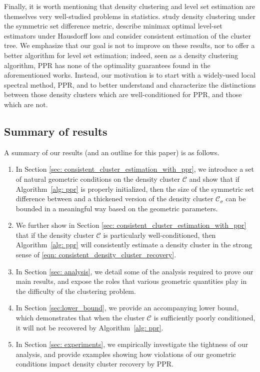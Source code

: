 \documentclass[11pt,twoside]{article}
\newcommand{\1}{\mathbbm{1}}
\newcommand{\Cset}{\mathcal{C}}
\newcommand{\Csig}{\Cset_{\sigma}}
\newcommand{\Cest}{\widehat{C}}
\begin{document}
Finally, it is worth mentioning that density clustering and level set estimation
are themselves very well-studied problems in statistics. \citet{polonik1995,
  rigollet2009} study density clustering under the symmetric set difference
metric, \citet{tsybakov1997,singh2009} describe minimax optimal level-set
estimators under Hausdorff loss and
\citet{hartigan1981,chaudhuri2010,balakrishnan2013,kpotufe11} consider
consistent estimation of the cluster tree. We emphasize that our goal is
not to improve on these results, nor to offer a better algorithm for level set
estimation; indeed, seen as a density clustering algorithm, PPR has none 
of the optimality guarantees found in the aforementioned works. Instead, our
motivation is to start with a widely-used local spectral method, PPR, and to
better understand and characterize the distinctions between those density 
clusters which are well-conditioned for PPR, and those which are not.  

\subsection{Summary of results}

A summary of our results (and an outline for this paper) is as follows. 

\begin{enumerate}
\item In Section \ref{sec: consistent_cluster_estimation_with_ppr}, we introduce 
  a set of natural geometric conditions on the density cluster $\Cset$
  and show that if Algorithm~\ref{alg: ppr} is properly initialized, then the size of
  the symmetric set difference between \smash{$\Cest$} and a thickened version
  of the density cluster $\Csig$ can be bounded in a meaningful way based on the
  geometric parameters. 
	
\item We further show in Section \ref{sec:
    consistent_cluster_estimation_with_ppr} that if the density cluster  
  $\Cset$ is particularly well-conditioned, then Algorithm~\ref{alg: ppr} 
  will consistently estimate a density cluster in the strong sense of
  \eqref{eqn: consistent_density_cluster_recovery}.   
	
\item In Section \ref{sec: analysis}, we detail some of the analysis required to 
  prove our main results, and expose the roles that various geometric quantities 
  play in the difficulty of the clustering problem.  
  
\item In Section \ref{sec:lower_bound}, we provide an accompanying lower bound,
  which demonstrates that when the cluster $\Cset$ is sufficiently poorly
  conditioned, it will not be recovered by Algorithm~\ref{alg: ppr}. 
	
\item In Section \ref{sec: experiments}, we empirically investigate the
  tightness of our analysis, and provide examples showing how violations of our  
  geometric conditions impact density cluster recovery by PPR.
\end{enumerate}
\end{document}
